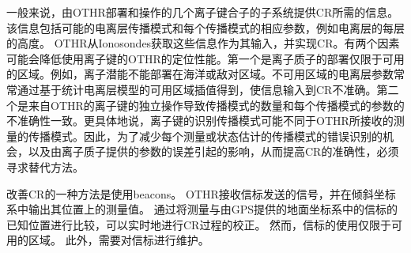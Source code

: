 一般来说，由OTHR部署和操作的几个离子键合子的子系统提供CR所需的信息。该信息包括可能的电离层传播模式和每个传播模式的相应参数，例如电离层的每层的高度\cite{wheadon1994ionospheric}。 OTHR从Ionosondes获取这些信息作为其输入，并实现CR。有两个因素可能会降低使用离子键的OTHR的定位性能。第一个是离子质子的部署仅限于可用的区域。例如，离子潜能不能部署在海洋或敌对区域。不可用区域的电离层参数常常通过基于统计电离层模型的可用区域插值得到，使信息输入到CR不准确。第二个是来自OTHR的离子键的独立操作导致传播模式的数量和每个传播模式的参数的不准确性一致。更具体地说，离子键的识别传播模式可能不同于OTHR所接收的测量的传播模式。因此，为了减少每个测量或状态估计的传播模式的错误识别的机会，以及由离子质子提供的参数的误差引起的影响，从而提高CR的准确性，必须寻求替代方法。

改善CR的一种方法是使用beacons\cite{weijers1995oth}。 OTHR接收信标发送的信号，并在倾斜坐标系中输出其位置上的测量值。 通过将测量与由GPS提供的地面坐标系中的信标的已知位置进行比较，可以实时地进行CR过程的校正。 然而，信标的使用仅限于可用的区域。 此外，需要对信标进行维护。


